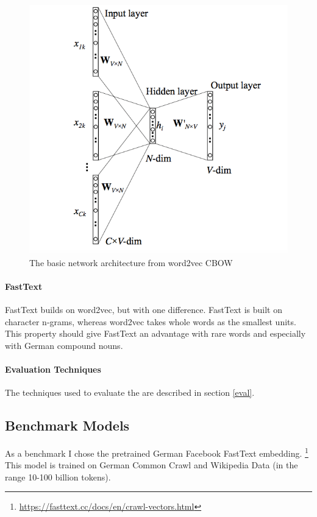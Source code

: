 \documentclass[10pt,a4paper]{article}
\begin{document}
\begin{figure}
	\begin{center}
		\includegraphics[scale=0.4]{./Pictures/w2v_arch.png}
		
		\caption{The basic network architecture from word2vec CBOW}
		\label{w2v_arch}
	\end{center}
\end{figure}

    \paragraph{FastText} FastText builds on word2vec, but with one difference. FastText is built on character n-grams, whereas word2vec takes whole words as the smallest units. This property should give FastText an advantage with rare words and especially with German compound nouns.
    
    \paragraph{Evaluation Techniques}
    The techniques used to evaluate the are described in section \ref{eval}.
    
    
    \subsection{Benchmark Models}
    As a benchmark I chose the pretrained German Facebook FastText embedding. \footnote{\url{https://fasttext.cc/docs/en/crawl-vectors.html}} This model is trained on German Common Crawl and Wikipedia Data (in the range 10-100 billion tokens).
			
\end{document}
